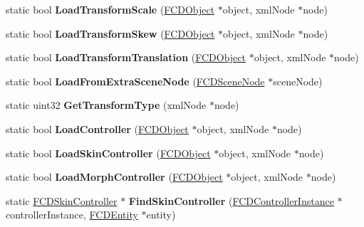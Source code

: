 \begin{DoxyCompactItemize}
\item 
\hypertarget{classFArchiveXML_abfd157c5d4f7569b81d84b7c493aa4e4}{
static bool {\bfseries LoadTransformScale} (\hyperlink{classFCDObject}{FCDObject} $\ast$object, xmlNode $\ast$node)}
\label{classFArchiveXML_abfd157c5d4f7569b81d84b7c493aa4e4}

\item 
\hypertarget{classFArchiveXML_a53c5e477e3f94544e64e8d5ab4beca3b}{
static bool {\bfseries LoadTransformSkew} (\hyperlink{classFCDObject}{FCDObject} $\ast$object, xmlNode $\ast$node)}
\label{classFArchiveXML_a53c5e477e3f94544e64e8d5ab4beca3b}

\item 
\hypertarget{classFArchiveXML_ab61719bd09628e5162b71a9b799b869b}{
static bool {\bfseries LoadTransformTranslation} (\hyperlink{classFCDObject}{FCDObject} $\ast$object, xmlNode $\ast$node)}
\label{classFArchiveXML_ab61719bd09628e5162b71a9b799b869b}

\item 
\hypertarget{classFArchiveXML_aed27eb532121fbeaf0d39c0ce5f5ff00}{
static bool {\bfseries LoadFromExtraSceneNode} (\hyperlink{classFCDSceneNode}{FCDSceneNode} $\ast$sceneNode)}
\label{classFArchiveXML_aed27eb532121fbeaf0d39c0ce5f5ff00}

\item 
\hypertarget{classFArchiveXML_a260ad693ec5a2cb70aef89db90f5ab60}{
static uint32 {\bfseries GetTransformType} (xmlNode $\ast$node)}
\label{classFArchiveXML_a260ad693ec5a2cb70aef89db90f5ab60}

\item 
\hypertarget{classFArchiveXML_a92f8ac29a7828b5a7d4084321463912d}{
static bool {\bfseries LoadController} (\hyperlink{classFCDObject}{FCDObject} $\ast$object, xmlNode $\ast$node)}
\label{classFArchiveXML_a92f8ac29a7828b5a7d4084321463912d}

\item 
\hypertarget{classFArchiveXML_a34c3cb5de48205da989e7755c2ffdc78}{
static bool {\bfseries LoadSkinController} (\hyperlink{classFCDObject}{FCDObject} $\ast$object, xmlNode $\ast$node)}
\label{classFArchiveXML_a34c3cb5de48205da989e7755c2ffdc78}

\item 
\hypertarget{classFArchiveXML_a7b81e68b09f6269713d4c9fe2ada5f43}{
static bool {\bfseries LoadMorphController} (\hyperlink{classFCDObject}{FCDObject} $\ast$object, xmlNode $\ast$node)}
\label{classFArchiveXML_a7b81e68b09f6269713d4c9fe2ada5f43}

\item 
\hypertarget{classFArchiveXML_a98489c2838a3d4eb96a4f04824081edb}{
static \hyperlink{classFCDSkinController}{FCDSkinController} $\ast$ {\bfseries FindSkinController} (\hyperlink{classFCDControllerInstance}{FCDControllerInstance} $\ast$controllerInstance, \hyperlink{classFCDEntity}{FCDEntity} $\ast$entity)}
\label{classFArchiveXML_a98489c2838a3d4eb96a4f04824081edb}


\end{DoxyCompactItemize}
